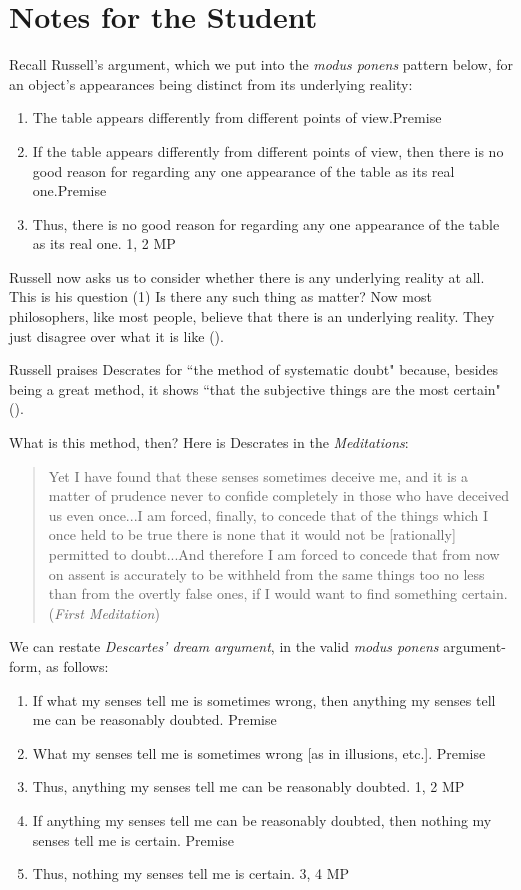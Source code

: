 \documentclass[oneside,letterpaper,12pt]{book}
\begin{document}
\section{Notes for the Student} 
\par Recall Russell's argument, which we put into the \emph{modus ponens} pattern below, for an object's appearances being distinct from its underlying reality:
\begin{enumerate}
	\item The table appears differently from different points of view.\hfill Premise
	\item If the table appears differently from different points of view, then there is no good reason for regarding any one appearance of the table as its real one.\hfill Premise
	\item Thus, there is no good reason for regarding any one appearance of the table as its real one. \hfill 1, 2 MP
\end{enumerate}
Russell now asks us to consider whether there is any underlying reality at all. This is his question (1) Is there any such thing as matter? Now most philosophers, like most people, believe that there is an underlying reality. They just disagree over what it is like (\pageref{Q1}).
\par Russell praises Descrates for ``the method of systematic doubt" because, besides being a great method, it shows ``that the subjective things are the most certain" (\pageref{doubt}).
\par What is this method, then? Here is Descrates in the \textit{Meditations}:
\begin{quote}
	Yet I have found that these senses sometimes deceive me, and it is a matter of prudence never to confide completely in those who have deceived us even once...I am forced, finally, to concede that of the things which I once held to be true there is none that it would not be [rationally] permitted to doubt...And therefore I am forced to concede that from now on assent is accurately to be withheld from the same things too no less than from the overtly false ones, if I would want to find something certain. (\textit{First Meditation})
\end{quote}
We can restate \emph{Descartes' dream argument}, in the valid \textit{modus ponens} argument-form, as follows:
\begin{enumerate}
	\item If what my senses tell me is sometimes wrong, then anything my senses tell me can be reasonably doubted. \hfill Premise
	\item What my senses tell me is sometimes wrong [as in illusions, etc.]. \hfill Premise
	\item Thus, anything my senses tell me can be reasonably doubted. \hfill 1, 2 MP
	\item If anything my senses tell me can be reasonably doubted, then nothing my senses tell me is certain. \hfill Premise
	\item Thus, nothing my senses tell me is certain. \hfill 3, 4 MP
\end{enumerate}
\end{document}
